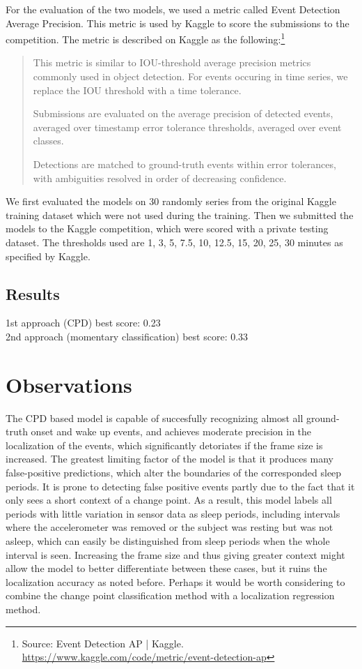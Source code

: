 \documentclass{article}
\begin{document}
For the evaluation of the two models, we used a metric called Event Detection Average Precision. This metric is used by Kaggle to score the submissions to the competition. The metric is described on Kaggle as the following:\footnote{Source: Event Detection AP | Kaggle. \url{https://www.kaggle.com/code/metric/event-detection-ap}}
\begin{quote}
    This metric is similar to IOU-threshold average precision metrics commonly
    used in object detection. For events occuring in time series, we replace the
    IOU threshold with a time tolerance.

    Submissions are evaluated on the average precision of detected events,
    averaged over timestamp error tolerance thresholds, averaged over event
    classes.

    Detections are matched to ground-truth events within error tolerances, with
    ambiguities resolved in order of decreasing confidence.
\end{quote}

We first evaluated the models on 30 randomly series from the original Kaggle training dataset which were not used during the training. Then we submitted the models to the Kaggle competition, which were scored with a private testing dataset. The thresholds used are 1, 3, 5, 7.5, 10, 12.5, 15, 20, 25, 30 minutes as specified by Kaggle.

\subsection{Results}
1st approach (CPD) best score: 0.23\\
2nd approach (momentary classification) best score: 0.33

\section{Observations}

The CPD based model is capable of succesfully recognizing almost all ground-truth onset and wake up events, and achieves moderate precision in the localization of the events, which significantly detoriates if the frame size is increased. The greatest limiting factor of the model is that it produces many false-positive predictions, which alter the boundaries of the corresponded sleep periods. It is prone to detecting false positive events partly due to the fact that it only sees a short context of a change point. As a result, this model labels all periods with little variation in sensor data as sleep periods, including intervals where the accelerometer was removed or the subject was resting but was not asleep, which can easily be distinguished from sleep periods when the whole interval is seen. Increasing the frame size and thus giving greater context might allow the model to better differentiate between these cases, but it ruins the localization accuracy as noted before. Perhaps it would be worth considering to combine the change point classification method with a localization regression method.






\end{document}

